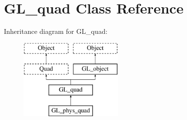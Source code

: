\hypertarget{class_g_l__quad}{
\section{GL\_\-quad Class Reference}
\label{class_g_l__quad}
}
Inheritance diagram for GL\_\-quad:\begin{figure}[H]
\begin{center}
\leavevmode
\includegraphics[height=4.000000cm]{class_g_l__quad}
\end{center}
\end{figure}
